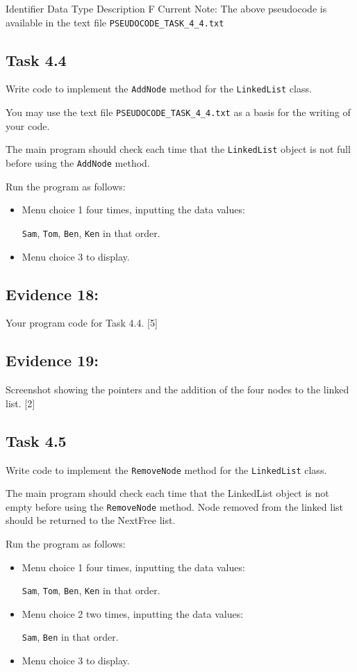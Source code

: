 Identifier Data Type Description F Current Note: The above pseudocode
is available in the text file \texttt{PSEUDOCODE\_TASK\_4\_4.txt}

\subsection*{Task 4.4 }

Write code to implement the \texttt{AddNode} method for the \texttt{LinkedList}
class. 

You may use the text file \texttt{PSEUDOCODE\_TASK\_4\_4.txt} as a
basis for the writing of your code.

The main program should check each time that the \texttt{LinkedList}
object is not full before using the \texttt{AddNode} method.

Run the program as follows: 
\begin{itemize}
\item Menu choice 1 four times, inputting the data values:

\texttt{Sam}, \texttt{Tom}, \texttt{Ben}, \texttt{Ken} in that order. 
\item Menu choice 3 to display.
\end{itemize}

\subsection*{Evidence 18: }

Your program code for Task 4.4. \hfill{}{[}5{]}

\subsection*{Evidence 19: }

Screenshot showing the pointers and the addition of the four nodes
to the linked list. \hfill{}{[}2{]}

\subsection*{Task 4.5 }

Write code to implement the \texttt{RemoveNode} method for the \texttt{LinkedList}
class. 

The main program should check each time that the LinkedList object
is not empty before using the \texttt{RemoveNode} method. Node removed
from the linked list should be returned to the NextFree list. 

Run the program as follows: 
\begin{itemize}
\item Menu choice 1 four times, inputting the data values: 

\texttt{Sam}, \texttt{Tom}, \texttt{Ben}, \texttt{Ken} in that order. 
\item Menu choice 2 two times, inputting the data values: 

\texttt{Sam}, \texttt{Ben} in that order.
\item Menu choice 3 to display. 
\end{itemize}

